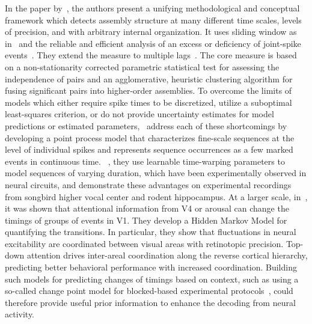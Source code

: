 \documentclass[brainsci, %
               review,submit,pdftex,moreauthors
               ]{Definitions/mdpi}
\begin{document}
In the paper by~\citet{russo_cell_2017}, the authors present a unifying methodological and conceptual framework which detects assembly structure at many different time scales, levels of precision, and with arbitrary internal organization. It uses  sliding window as in~\citep{grun_unitary_2002} and the reliable and efficient analysis of an excess or deficiency of joint-spike events~\citep{pipa_neuroxidence_2008}. They extend the measure to multiple lags~\citep{torre_synchronous_2016}. The core measure is based on a non-stationarity corrected parametric statistical test for assessing the independence of pairs and an agglomerative, heuristic clustering algorithm for fusing significant pairs into higher-order assemblies.  To overcome the limits of models which either require spike times to be discretized, utilize a suboptimal least-squares criterion, or do not provide uncertainty estimates for model predictions or estimated parameters,~\citep{williams_point_2020} address each of these shortcomings by developing a point process model that characterizes fine-scale sequences at the level of individual spikes and represents sequence occurrences as a few marked events in continuous time. ~\citep{kass_statistical_2005}, they use learnable time-warping parameters to model sequences of varying duration, which have been experimentally observed in neural circuits, and demonstrate these advantages on experimental recordings from songbird higher vocal center and rodent hippocampus.
At a larger scale, in~\citep{van_kempen_top-down_2021}, it was shown that attentional information from V4 or arousal can change the timings of groups of events in V1. They develop a Hidden Markov Model for quantifying the transitions. In particular, they show that fluctuations in neural excitability are coordinated between visual areas with retinotopic precision. Top-down attention drives inter-areal coordination along the reverse cortical hierarchy, predicting better behavioral performance with increased coordination. Building such models for predicting changes of timings based on context, such as using a so-called change point model for blocked-based experimental protocols~\citep{pasturel_humans_2020}, could therefore provide useful prior information to enhance the decoding from neural activity.
%
\end{document}
